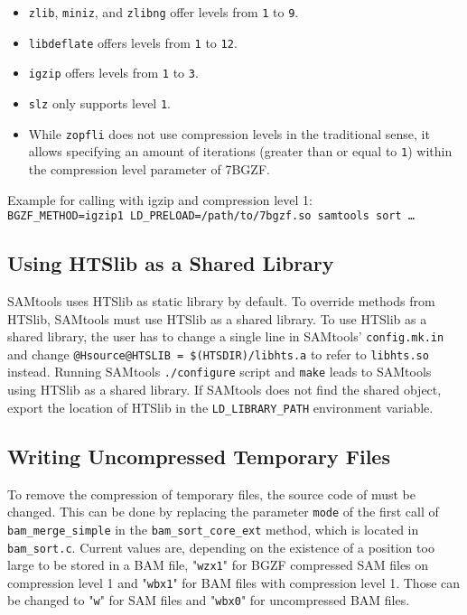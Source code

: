 \begin{itemize}
\itemsep 0mm
    \item {\texttt{zlib}}, {\texttt{miniz}}, and {\texttt{zlibng}} offer levels from \texttt{1} to \texttt{9}.
    \item {\texttt{libdeflate}} offers levels from \texttt{1} to \texttt{12}.
    \item {\texttt{igzip}} offers levels from \texttt{1} to \texttt{3}.
    \item {\texttt{slz}} only supports level \texttt{1}.
    \item While {\texttt{zopfli}} does not use compression levels in the traditional sense, it allows specifying an amount of iterations (greater than or equal to \texttt{1}) within the compression level parameter of 7BGZF.
\end{itemize}
Example for calling \sort with igzip and compression level 1: \\
\texttt{BGZF\_METHOD=igzip1 LD\_PRELOAD=/path/to/7bgzf.so samtools sort …}

\subsection{Using HTSlib as a Shared Library}\label{shared}

SAMtools uses HTSlib as static library by default. To override methods from HTSlib, SAMtools must use HTSlib as a shared library.
To use HTSlib as a shared library, the user has to change a single line in SAMtools' \texttt{config.mk.in} and change \texttt{@Hsource@HTSLIB = \$(HTSDIR)/libhts.a} to refer to \texttt{libhts.so} instead. Running SAMtools \texttt{./configure} script and \texttt{make} leads to SAMtools using HTSlib as a shared library. If SAMtools does not find the shared object, export the location of HTSlib in the \texttt{LD\_LIBRARY\_PATH} environment variable.


\subsection{Writing Uncompressed Temporary Files}\label{changeSource}

To remove the compression of temporary files, the source code of \sort must be changed.  
This can be done by replacing the parameter \texttt{mode} of the first call of \texttt{bam\_merge\_simple} in the \texttt{bam\_sort\_core\_ext} method, which is located in \texttt{bam\_sort.c}. Current values are, depending on the existence of a position too large to be stored in a BAM file, "\texttt{wzx1}" for BGZF compressed SAM files on compression level 1 and "\texttt{wbx1}" for BAM files with compression level 1. Those can be changed to "\texttt{w}" for SAM files and "\texttt{wbx0}" for uncompressed BAM files.

